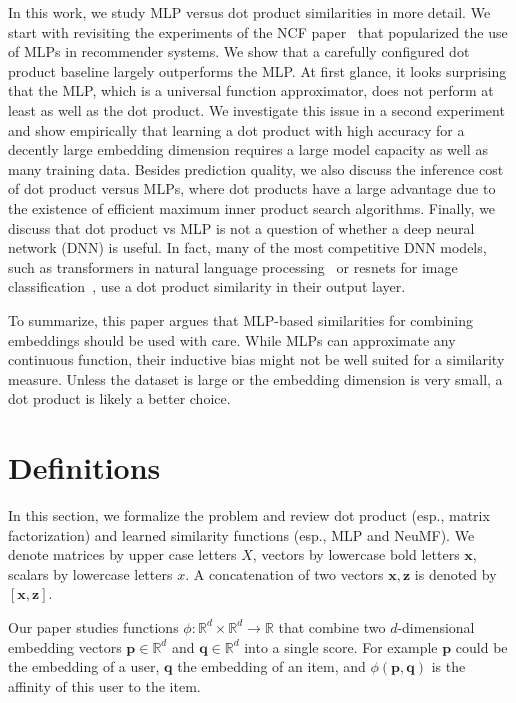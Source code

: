 \documentclass{article}
\newcommand{\bx}{\mathbf{x}}
\newcommand{\bz}{\mathbf{z}}
\newcommand{\embu}{\mathbf{p}}
\newcommand{\embi}{\mathbf{q}}
\begin{document}
In this work, we study MLP versus dot product similarities in more detail.
We start with revisiting the experiments of the NCF paper~\cite{he:www17} that popularized the use of MLPs in recommender systems.
We show that a carefully configured dot product baseline largely outperforms the MLP.
At first glance, it looks surprising that the MLP, which is a universal function approximator, does not perform at least as well as the dot product.
We investigate this issue in a second experiment and show empirically that learning a dot product with high accuracy for a decently large embedding dimension requires a large model capacity as well as many training data.
Besides prediction quality, we also discuss the inference cost of dot product versus MLPs, where dot products have a large advantage due to the existence of efficient maximum inner product search algorithms.
Finally, we discuss that dot product vs MLP is not a question of whether a deep neural network (DNN) is useful.
In fact, many of the most competitive DNN models, such as transformers in natural language processing~\cite{devlin:arxiv18} or resnets for image classification~\cite{he:cvpr16}, use a dot product similarity in their output layer.

To summarize, this paper argues that MLP-based similarities for combining embeddings should be used with care.
While MLPs can approximate any continuous function, their inductive bias might not be well suited for a similarity measure.
Unless the dataset is large or the embedding dimension is very small, a dot product is likely a better choice.


\section{Definitions}
\label{sec:def}

In this section, we formalize the problem and review dot product (esp., matrix factorization) and learned similarity functions (esp., MLP and NeuMF).
We denote matrices by upper case letters $X$, vectors by lowercase bold letters $\bx$, scalars by lowercase letters $x$.
A concatenation of two vectors $\bx, \bz$ is denoted by $[\bx,\bz]$.

Our paper studies functions $\phi : \mathbb{R}^d \times \mathbb{R}^d \to \mathbb{R}$ that combine two $d$-dimensional embedding vectors $\embu \in \mathbb{R}^d$ and $\embi \in \mathbb{R}^d$ into a single score.
For example $\embu$ could be the embedding of a user, $\embi$ the embedding of an item, and $\phi(\embu, \embi)$ is the affinity of this user to the item.
\end{document}

